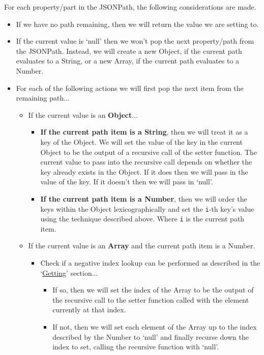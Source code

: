 \begin{center}
    For each property/part in the JSONPath, the following considerations are made.
    \begin{itemize}
        \item If we have no path remaining, then we will return the value we are setting to.
        \item If the current value is `null' then we won't pop the next property/path from the JSONPath. Instead, we will create a new Object, if the current path evaluates to a String, or a new Array, if the current path evaluates to a Number.
        \item For each of the following actions we will first pop the next item from the remaining path...
        \begin{itemize}
            \item If the current value is an \textbf{Object}...
            \begin{itemize}
                \item \textbf{If the current path item is a String}, then we will treat it as a key of the Object. We will set the value of the key in the current Object to be the output of a recursive call of the setter function. The current value to pass into the recursive call depends on whether the key already exists in the Object. If it does then we will pass in the value of the key. If it doesn't then we will pass in `null'.
                \item \textbf{If the current path item is a Number}, then we will order the keys within the Object lexicographically and set the \verb|i|-th key's value using the technique described above. Where \verb|i| is the current path item.
            \end{itemize}
            \item If the current value is an \textbf{Array} and the current path item is a Number.
            \begin{itemize}
                \item Check if a negative index lookup can be performed as described in the `\hyperref[sec:jsonpath-getting]{Getting}' section...
                \begin{itemize}
                    \item If so, then we will set the index of the Array to be the output of the recursive call to the setter function called with the element currently at that index.
                    \item If not, then we will set each element of the Array up to the index described by the Number to `null' and finally recurse down the index to set, calling the recursive function with `null'.

\end{itemize}
\end{itemize}
\end{itemize}
\end{itemize}
\end{center}
